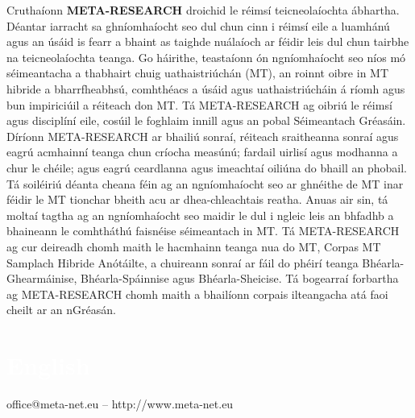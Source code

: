 \begin{multicols}{2}
Cruthaíonn \textbf{META-RESEARCH} droichid le réimsí teicneolaíochta ábhartha. Déantar iarracht sa ghníomhaíocht seo dul chun cinn i réimsí eile a luamhánú agus an úsáid is fearr a bhaint as taighde nuálaíoch ar féidir leis dul chun tairbhe na teicneolaíochta teanga. Go háirithe, teastaíonn ón ngníomhaíocht seo níos mó séimeantacha a thabhairt chuig uathaistriúchán (MT), an roinnt oibre in MT hibride a bharrfheabhsú, comhthéacs a úsáid agus uathaistriúcháin á ríomh agus bun impiriciúil a réiteach don MT. Tá META-RESEARCH ag oibriú le réimsí agus disciplíní eile, cosúil le foghlaim innill agus an pobal Séimeantach Gréasáin. Díríonn META-RESEARCH ar bhailiú sonraí, réiteach sraitheanna sonraí agus eagrú acmhainní teanga chun críocha measúnú; fardail uirlisí agus modhanna a chur le chéile; agus eagrú ceardlanna agus imeachtaí oiliúna do bhaill an phobail. Tá soiléiriú déanta cheana féin ag an ngníomhaíocht seo ar ghnéithe de MT inar féidir le MT tionchar bheith acu ar dhea-chleachtais reatha. Anuas air sin, tá moltaí tagtha ag an ngníomhaíocht seo maidir le dul i ngleic leis an bhfadhb a bhaineann le comhtháthú faisnéise séimeantach in MT. Tá META-RESEARCH ag cur deireadh chomh maith le hacmhainn teanga nua do MT, Corpas MT Samplach Hibride Anótáilte, a chuireann sonraí ar fáil do phéirí teanga Bhéarla-Ghearmáinise, Bhéarla-Spáinnise agus Bhéarla-Sheicise. Tá bogearraí forbartha ag META-RESEARCH chomh maith a bhailíonn corpais ilteangacha atá faoi cheilt ar an nGréasán.


\end{multicols}

\vfill

\makeatletter
{}
{
  \renewcommand*{\theHsection}{\thepart.\thesection}
}
\makeatother
\part*{\textcolor{white}{English}}
\setcounter{section}{0}
\setcounter{figure}{0}

\centerline{office@meta-net.eu -- http://www.meta-net.eu}


\cleardoublepage

